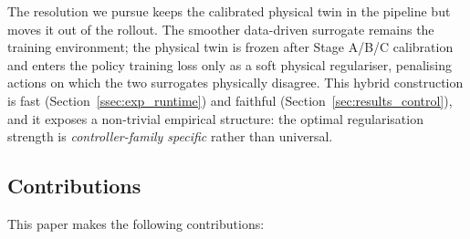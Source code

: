 The resolution we pursue keeps the calibrated physical twin in the
pipeline but moves it out of the rollout. The smoother data-driven
surrogate remains the training environment; the physical twin is
frozen after Stage A/B/C calibration and enters the policy training
loss only as a soft physical regulariser, penalising actions on which
the two surrogates physically disagree. This hybrid construction is
fast (Section~\ref{ssec:exp_runtime}) and faithful
(Section~\ref{sec:results_control}), and it exposes a non-trivial
empirical structure: the optimal regularisation strength is
\emph{controller-family specific} rather than universal.

\subsection*{Contributions}

This paper makes the following contributions:

